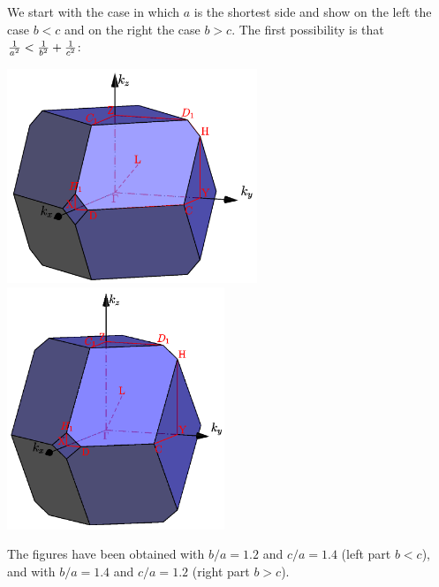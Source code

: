 \documentclass[12pt,a4paper]{article}
\begin{document}
We start with the case in which $a$ is the shortest side and show on the
left the case $b<c$ and on the right the case $b>c$. 
The first possibility is that ${1\over a^2} <
{1\over b^2} + {1\over c^2}$:
\begin{center}
\includegraphics[width=7.5cm,angle=0]{images/ofc_1.png} \hspace{1cm}
\includegraphics[width=6.5cm,angle=0]{images/ofc_2.png} 
\end{center}
The figures have been obtained with $b/a=1.2$ and $c/a=1.4$ (left part $b<c$),
and with $b/a=1.4$ and $c/a=1.2$ (right part $b>c$).
\end{document}
